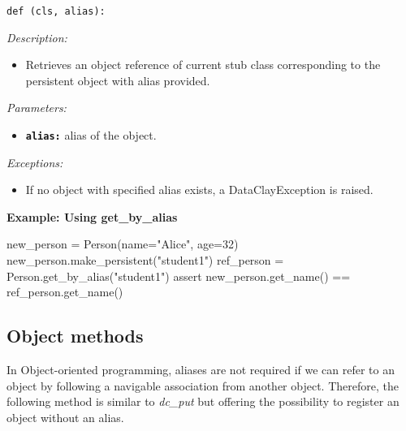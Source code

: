\begin{dBox}
\texttt{def (cls, alias):}
\LINE

{\it Description:}

\begin{itemize}
    \item Retrieves an object reference of current stub class corresponding to the persistent object with alias provided.
\end{itemize}

{\it Parameters:}

\begin{itemize}
    \item \texttt{\bfseries alias:} alias of the object.
\end{itemize}

{\it Exceptions:}

\begin{itemize}
    \item If no object with specified alias exists, a DataClayException is raised.
\end{itemize}

\end{dBox}

\begin{tBox}
\textcolor{basecolor} {\bf Example: Using get\_by\_alias }
\begin{python}
new_person = Person(name="Alice", age=32)
new_person.make_persistent("student1")
ref_person = Person.get_by_alias("student1")
assert new_person.get_name() == ref_person.get_name()
\end{python}
\end{tBox}



\subsection{Object methods}

In Object-oriented programming, aliases are not required if we can refer to an object by following a navigable association from another object. Therefore, the following method is similar to \textit{dc\_put} but offering the possibility to register an object without an alias.


